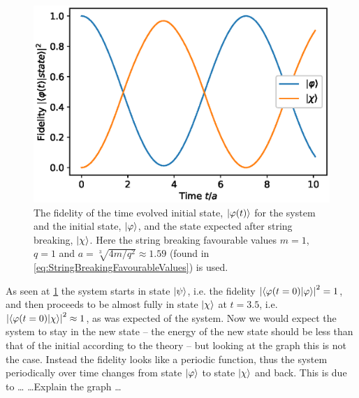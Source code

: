 \documentclass[../main.tex]{subfiles} %
\begin{document}
\begin{figure}[t]
    \centering
    \includegraphics[width=\textwidth]{text/images/stringBreakingNumerical.eps}
    \caption{The fidelity of the time evolved initial state, $\ket{\varphi(t)}$ for the system and the initial state, $\ket{\varphi}$, and the state expected after string breaking, $\ket{\chi}$. Here the string breaking favourable values $m=1$, $q=1$ and $a = \sqrt[3\:\:]{4m/q^2} \approx \num{1.59}$ (found in \cref{eq:StringBreakingFavourableValues}) is used.}
    \label{fig:stringBreakingNumerical}
\end{figure}

As seen at \cref{fig:stringBreakingNumerical} the system starts in state $\ket{\psi}$, i.e. the fidelity $\abs{\innerproduct{\varphi(t=0)}{\varphi}}^2 = 1$, and then proceeds to be almost fully in state $\ket{\chi}$ at $t=\num{3.5}$, i.e. $\abs{\innerproduct{\varphi(t=0)}{\chi}}^2 \approx 1$, as was expected of the system. Now we would expect the system to stay in the new state -- the energy of the new state should be less than that of the initial according to the theory -- but looking at the graph this is not the case. Instead the fidelity looks like a periodic function, thus the system periodically over time changes from state $\ket{\varphi}$ to state $\ket{\chi}$ and back. This is due to \ldots
\ldots Explain the graph \ldots

\end{document}
